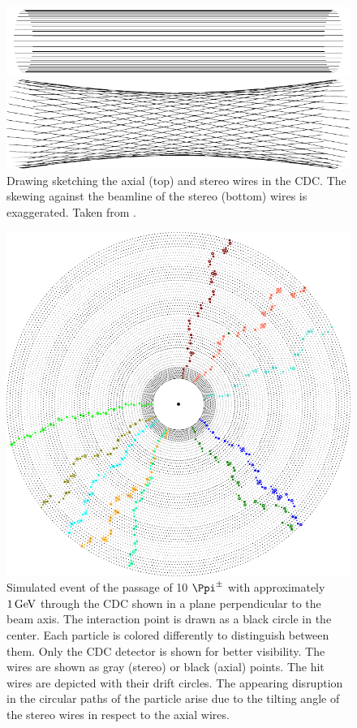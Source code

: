 \begin{figure}
  \centering
  \includegraphics{figures/experimental_setup/axialLayers.pdf}
  
  \vspace*{1.5cm}
  
  \includegraphics{figures/experimental_setup/stereoLayers.pdf}
  \caption[Drawing sketching the axial (top) and stereo wires in the CDC.]{Drawing sketching the axial (top) and stereo wires in the CDC. The skewing against the beamline of the stereo (bottom) wires is exaggerated. Taken from \cite{oliver}.}
  \label{fig-axial-stereo}
\end{figure}

\begin{figure}
  \centering
  \includegraphics[width=0.8\linewidth]{figures/experimental_setup/eventDisplayPionGun.png}
  \caption[Simulated event of the passage of 10 $\Ppi^\pm$ through the CDC.]{Simulated event of the passage of 10 $\Ppi^\pm$ with approximately $\unit[1]{GeV}$ through the CDC shown in a plane perpendicular to the beam axis. The interaction point is drawn as a black circle in the center. Each particle is colored differently to distinguish between them. Only the CDC detector is shown for better visibility. The wires are shown as gray (stereo) or black (axial) points. The hit wires are depicted with their drift circles. The appearing disruption in the circular paths of the particle arise due to the tilting angle of the stereo wires in respect to the axial wires.}
  \label{fig-event-display}
\end{figure}


